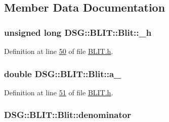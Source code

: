 \subsection{Member Data Documentation}
\hypertarget{class_d_s_g_1_1_b_l_i_t_1_1_blit_a632c6f070187969b90c70b65668b82bc}{
\subsubsection[{\+\_\+h}]{\setlength{\rightskip}{0pt plus 5cm}unsigned long D\+S\+G\+::\+B\+L\+I\+T\+::\+Blit\+::\+\_\+h\hspace{0.3cm}{\ttfamily [protected]}}}\label{class_d_s_g_1_1_b_l_i_t_1_1_blit_a632c6f070187969b90c70b65668b82bc}


Definition at line \hyperlink{_b_l_i_t_8h_source_l00050}{50} of file \hyperlink{_b_l_i_t_8h_source}{B\+L\+I\+T.\+h}.

\hypertarget{class_d_s_g_1_1_b_l_i_t_1_1_blit_a66e2a97840ad0772daaaa9aea63b77b4}{
\subsubsection[{a\+\_\+}]{\setlength{\rightskip}{0pt plus 5cm}double D\+S\+G\+::\+B\+L\+I\+T\+::\+Blit\+::a\+\_\+\hspace{0.3cm}{\ttfamily [protected]}}}\label{class_d_s_g_1_1_b_l_i_t_1_1_blit_a66e2a97840ad0772daaaa9aea63b77b4}


Definition at line \hyperlink{_b_l_i_t_8h_source_l00051}{51} of file \hyperlink{_b_l_i_t_8h_source}{B\+L\+I\+T.\+h}.

\hypertarget{class_d_s_g_1_1_b_l_i_t_1_1_blit_a6de89a5a240f226c940aef97661c9cee}{
\subsubsection[{denominator}]{ D\+S\+G\+::\+B\+L\+I\+T\+::\+Blit\+::denominator\hspace{0.3cm}{\ttfamily [protected]}}}\label{class_d_s_g_1_1_b_l_i_t_1_1_blit_a6de89a5a240f226c940aef97661c9cee}


